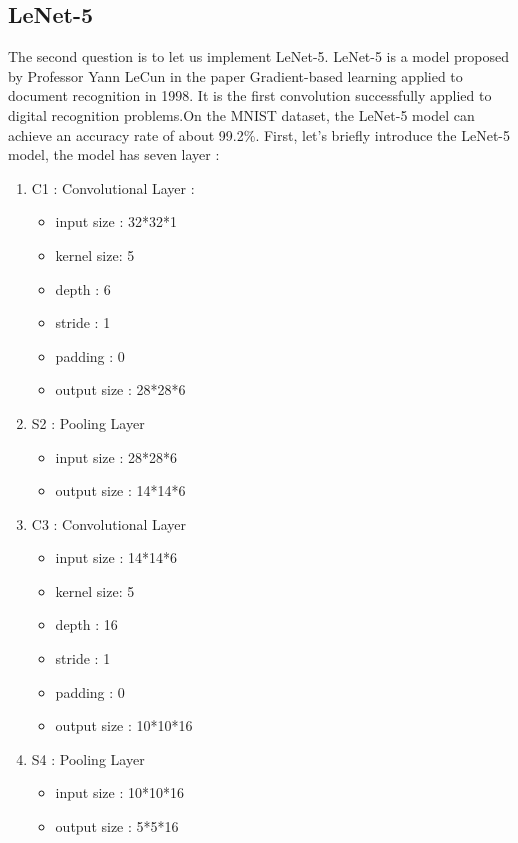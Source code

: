 \documentclass[conference]{IEEEtran}
\begin{document}
    \subsection{LeNet-5}
    The second question is to let us implement LeNet-5. LeNet-5 is a model proposed by Professor Yann LeCun in the paper Gradient-based learning applied to document recognition in 1998. It is the first convolution successfully applied to digital recognition problems.On the MNIST dataset, the LeNet-5 model can achieve an accuracy rate of about 99.2\%.
    \indent First, let's briefly introduce the LeNet-5 model, the model has seven layer :
    \begin{enumerate}
        \item C1 : Convolutional Layer : 
        \begin{itemize}
            \item input size : 32*32*1
            \item kernel size: 5
            \item depth : 6
            \item stride : 1
            \item padding : 0
            \item output size : 28*28*6
        \end{itemize}
        \item S2 : Pooling Layer
        \begin{itemize}
            \item input size : 28*28*6
            \item output size : 14*14*6
        \end{itemize}
        \item C3 : Convolutional Layer
        \begin{itemize}
            \item input size : 14*14*6
            \item kernel size: 5
            \item depth : 16
            \item stride : 1
            \item padding : 0
            \item output size : 10*10*16
        \end{itemize}
        \item S4 : Pooling Layer
        \begin{itemize}
            \item input size : 10*10*16
            \item output size : 5*5*16

\end{itemize}
\end{enumerate}
\end{document}
